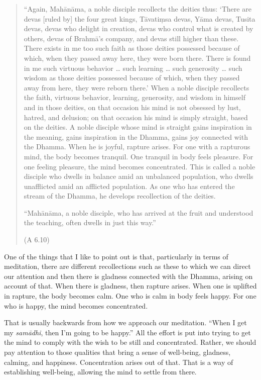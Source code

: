 \begin{quotation}
“Again, Mahānāma, a noble disciple recollects the deities thus: ‘There
are devas {[}ruled by{]} the four great kings, Tāvatiṃsa devas, Yāma
devas, Tusita devas, devas who delight in creation, devas who control
what is created by others, devas of Brahmā’s company, and devas still
higher than these. There exists in me too such faith as those deities
possessed because of which, when they passed away here, they were born
there. There is found in me such virtuous behavior \ldots{} such learning \ldots{}
such generosity \ldots{} such wisdom as those deities possessed because of
which, when they passed away from here, they were reborn there.’ When a
noble disciple recollects the faith, virtuous behavior, learning,
generosity, and wisdom in himself and in those deities, on that occasion
his mind is not obsessed by lust, hatred, and delusion; on that occasion
his mind is simply straight, based on the deities. A noble disciple
whose mind is straight gains inspiration in the meaning, gains
inspiration in the Dhamma, gains joy connected with the Dhamma. When he
is joyful, rapture arises. For one with a rapturous mind, the body
becomes tranquil. One tranquil in body feels pleasure. For one feeling
pleasure, the mind becomes concentrated. This is called a noble disciple
who dwells in balance amid an unbalanced population, who dwells
unafflicted amid an afflicted population. As one who has entered the
stream of the Dhamma, he develops recollection of the deities.

“Mahānāma, a noble disciple, who has arrived at the fruit and understood
the teaching, often dwells in just this way.”

(A 6.10)
\end{quotation}

One of the things that I like to point out is that, particularly in
terms of meditation, there are different recollections such as these to
which we can direct our attention and then there is gladness connected
with the Dhamma, arising on account of that. When there is gladness,
then rapture arises. When one is uplifted in rapture, the body becomes
calm. One who is calm in body feels happy. For one who is happy, the
mind becomes concentrated.

That is usually backwards from how we approach our meditation. “When I
get my \emph{samādhi}, then I’m going to be happy.” All the effort is
put into trying to get the mind to comply with the wish to be still and
concentrated. Rather, we should pay attention to those qualities that
bring a sense of well-being, gladness, calming, and happiness.
Concentration arises out of that. That is a way of establishing
well-being, allowing the mind to settle from there.

